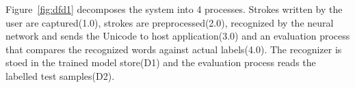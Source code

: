 \documentclass[12pt,a4paper]{report}
\begin{document}
Figure~\ref{fig:dfd1} decomposes the system into 4 processes. Strokes written by the user are captured(1.0), strokes are preprocessed(2.0), recognized by the neural network and sends the Unicode to host application(3.0) and an evaluation process that compares the recognized words against actual labels(4.0). The recognizer is stoed in the trained model store(D1) and the evaluation process reads the labelled test samples(D2).
\end{document}
